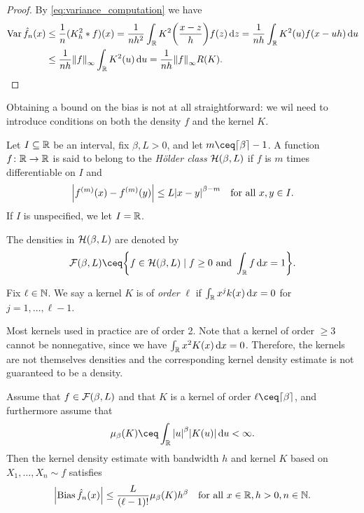 \begin{proof}
	By \cref{eq:variance_computation} we have
	\begin{align}
	\operatorname{Var} \hat f_n(x) &\leq \frac1n (K_h^2 * f)(x) = \frac{1}{nh^2} \int_\mathbb R K^2\qty(\frac{x - z}{h}) f(z) \dd{z} = \frac{1}{nh} \int_\mathbb R K^2(u) f(x - uh) \dd{u}  \label{eq:var_bound}\\
	&\leq \frac1{nh} \norm{f}_\infty \int_\mathbb R K^2(u) \dd{u} = \frac{1}{nh} \norm{f}_\infty R(K) .\nonumber 
	\end{align}
\end{proof}

Obtaining a bound on the bias is not at all straightforward: we wil need to introduce conditions on both the density $f$ and the kernel $K$. 
\begin{definition}
	Let $I \subseteq \mathbb R$ be an interval, fix $\beta, L > 0$, and let $m \ceq \ceil{\beta} - 1$. A function $f \colon \mathbb R \to \mathbb R$ is said to belong to the \emph{Hölder class} $\mathcal H(\beta, L)$ if $f$ is $m$ times differentiable on $I$ and
	\[
	\abs{f^{(m)}(x) - f^{(m)}(y)} \leq L \abs{x - y}^{\beta - m} \quad\text{for all $x, y \in I$}. 
	\]
	If $I$ is unspecified, we let $I = \mathbb R$. 
	
	The densities in $\mathcal H(\beta, L)$ are denoted by
	\[
	\FF(\beta, L) \ceq \qty{f \in \HH(\beta, L) \mid f \geq 0 \text{ and } \int_\RR f \dd{x} = 1}. 
	\]
\end{definition}

\begin{definition}
	Fix $\ell \in \mathbb N$. We say a kernel $K$ is of \emph{order} $\ell$ if $\int_\mathbb R x^j k(x) \dd{x} =0 $ for $j = 1, \dotsc, \ell - 1$. 
\end{definition}

\begin{remark}
	Most kernels used in practice are of order 2. Note that a kernel of order $\geq 3$ cannot be nonnegative, since we have $\int_\mathbb R x^2K(x) \dd{x} = 0$. Therefore, the kernels are not themselves densities and the corresponding kernel density estimate is not guaranteed to be a density. 
\end{remark}

\begin{proposition} \label{prop:bias_bound}
	Assume that $f \in \mathcal F(\beta, L)$ and that $K$ is a kernel of order $\ell \ceq \ceil{\beta}$, and furthermore assume that
	\[
	\mu_\beta(K) \ceq \int_\RR \abs{u}^\beta \abs{K(u)} \dd{u} < \infty. 
	\]
	Then the kernel density estimate with bandwidth $h$ and kernel $K$ based on $X_1, \dotsc, X_n \sim f$ satisfies
	\[
	\abs{\operatorname{Bias} \hat f_n(x)} \leq \frac{L}{(\ell - 1)!} \mu_\beta(K) h^\beta \quad\text{for all $x \in \mathbb R, h > 0, n \in \mathbb N$}. 
	\]
\end{proposition}

